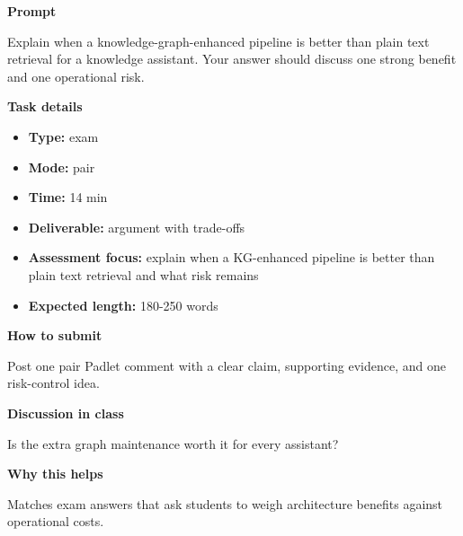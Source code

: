 \documentclass[11pt]{article}
\begin{document}
\begin{tcolorbox}[colback=white,colframe=MidnightBlue,title={Q5 Exam-Style Constructed Response},fonttitle=\bfseries,breakable]
\begin{center}
\end{center}

{\large\bfseries\color{MidnightBlue} Prompt}\par\medskip
Explain when a knowledge-graph-enhanced pipeline is better than plain text retrieval for a knowledge assistant. Your answer should discuss one strong benefit and one operational risk.

{\large\bfseries\color{MidnightBlue} Task details}\par\medskip
\begin{itemize}\item \textbf{Type:} exam
\item \textbf{Mode:} pair
\item \textbf{Time:} 14 min
\item \textbf{Deliverable:} argument with trade-offs
\item \textbf{Assessment focus:} explain when a KG-enhanced pipeline is better than plain text retrieval and what risk remains
\item \textbf{Expected length:} 180-250 words\end{itemize}

{\large\bfseries\color{MidnightBlue} How to submit}\par\medskip
Post one pair Padlet comment with a clear claim, supporting evidence, and one risk-control idea.

{\large\bfseries\color{MidnightBlue} Discussion in class}\par\medskip
Is the extra graph maintenance worth it for every assistant?

{\large\bfseries\color{MidnightBlue} Why this helps}\par\medskip
Matches exam answers that ask students to weigh architecture benefits against operational costs.


\end{tcolorbox}
\end{document}
